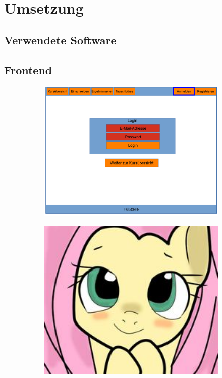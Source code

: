\chapter{Umsetzung}
\label{chapter:implementation}
    \section{Verwendete Software}
        
    
    \section{Frontend}
        
        \begin{figure}
            \centering
            \begin{subfigure}{0.49\textwidth}
                \includegraphics[width=1.0\textwidth]{./implementation/images/MockUpsFrontend/frontendLogin.png}
            \end{subfigure}
            \begin{subfigure}{0.49\textwidth}
                \includegraphics[width=1.0\textwidth]{./implementation/images/dummy.jpg}

\end{subfigure}
\end{figure}
